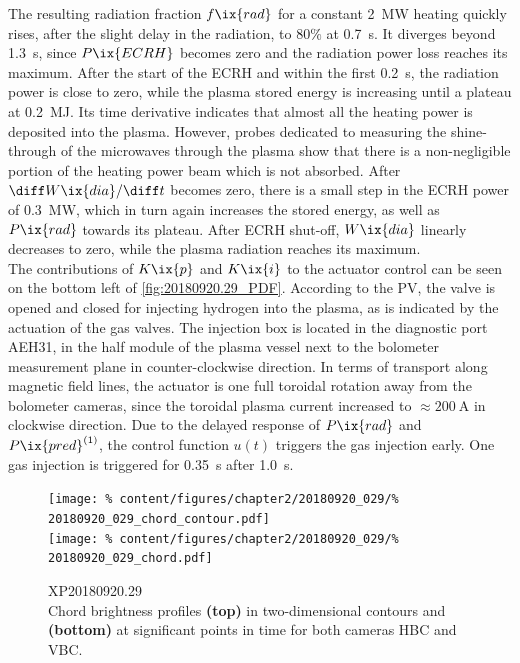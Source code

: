             The resulting radiation fraction $f\ix{rad}$ for a constant \SI{2}{\mega\watt} heating quickly rises, after the slight delay in the radiation, to $80\%$ at \SI{0.7}{\second}. It diverges beyond \SI{1.3}{\second}, since $P\ix{ECRH}$ becomes zero and the radiation power loss reaches its maximum. After the start of the ECRH and within the first \SI{0.2}{\second}, the radiation power is close to zero, while the plasma stored energy is increasing until a plateau at \SI{0.2}{\mega\joule}. Its time derivative indicates that almost all the heating power is deposited into the plasma. However, probes dedicated to measuring the shine-through of the microwaves through the plasma show that there is a non-negligible portion of the heating power beam which is not absorbed. After $\diff W\ix{dia}/\diff t$ becomes zero, there is a small step in the ECRH power of \SI{0.3}{\mega\watt}, which in turn again increases the stored energy, as well as $P\ix{rad}$ towards its plateau. After ECRH shut-off, $W\ix{dia}$ linearly decreases to zero, while the plasma radiation reaches its maximum.\\%
            The contributions of $K\ix{p}$ and $K\ix{i}$ to the actuator control can be seen on the bottom left of \cref{fig:20180920.29_PDF}. According to the PV, the valve is opened and closed for injecting hydrogen into the plasma, as is indicated by the actuation of the gas valves. The injection box is located in the diagnostic port AEH31, in the half module of the plasma vessel next to the bolometer measurement plane in counter-clockwise direction. In terms of transport along magnetic field lines, the actuator is one full toroidal rotation away from the bolometer cameras, since the toroidal plasma current increased to $\approx\SI{200}{\ampere}$ in clockwise direction. Due to the delayed response of $P\ix{rad}$ and $P\ix{pred}^{\left(1\right)}$, the control function $u\left(t\right)$ triggers the gas injection early. One gas injection is triggered for \SI{0.35}{\second} after \SI{1.0}{\second}.\\%
%
            \begin{figure}[t]%
                \centering%
                \texttt{[image: \%
                    content/figures/chapter2/20180920\_029/\%
                    20180920\_029\_chord\_contour.pdf]}\\%
                \texttt{[image: \%
                    content/figures/chapter2/20180920\_029/\%
                    20180920\_029\_chord.pdf]}\\%
                \caption{%
                    XP20180920.29\\%
                    Chord brightness profiles \textbf{(top)} in two-dimensional contours and \textbf{(bottom)} at significant points in time for both cameras HBC and VBC.}\label{fig:20180920.29_CP}%
            \end{figure}%
